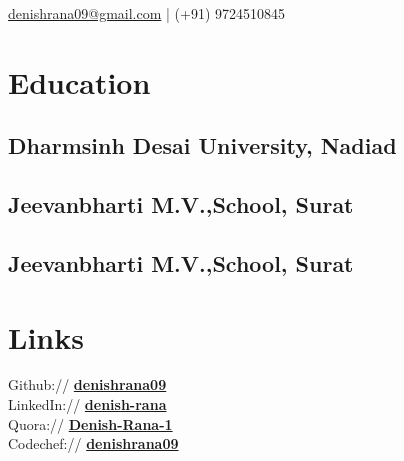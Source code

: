 \documentclass[]{denish-resume-openfont}
\begin{document}
%
%
\lastupdated

%
%
{ \href{mailto:denishrana09@gmail.com}{denishrana09@gmail.com} | (+91) 9724510845 }
%
%

\begin{minipage}[t]{0.3\textwidth}


\section{Education}

\subsection{Dharmsinh Desai \newline University, Nadiad}
\sectionsep

\subsection{Jeevanbharti M.V.,\newline School, Surat}
\sectionsep

\subsection{Jeevanbharti M.V.,\newline School, Surat}
\sectionsep



\section{Links}

Github:// \href{https://github.com/denishrana09}{\bf denishrana09} \\
LinkedIn://  \href{https://www.linkedin.com/in/denish-rana/}{\bf denish-rana} \\
Quora://  \href{https://www.quora.com/profile/Denish-Rana-1}{\bf Denish-Rana-1} \\
Codechef:// \href {https://www.codechef.com/users/denishrana09}{\bf denishrana09} \\


\end{minipage}
\end{document}
